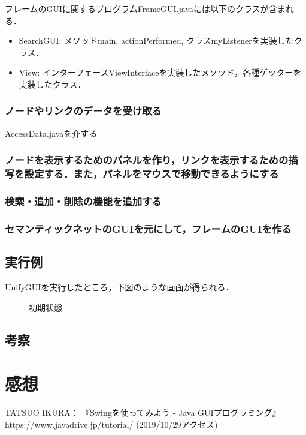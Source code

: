 \documentclass[12pt]{jarticle}
\begin{document}
フレームのGUIに関するプログラムFrameGUI.javaには以下のクラスが含まれる．
\begin{itemize}
\item SearchGUI: メソッドmain, actionPerformed, クラスmyListenerを実装したクラス．
\item View: インターフェースViewInterfaceを実装したメソッド，各種ゲッターを実装したクラス．
\end{itemize}

\subsubsection{ノードやリンクのデータを受け取る}
AccessData.javaを介する

\subsubsection{ノードを表示するためのパネルを作り，リンクを表示するための描写を設定する．また，パネルをマウスで移動できるようにする}

\subsubsection{検索・追加・削除の機能を追加する}

\subsubsection{セマンティックネットのGUIを元にして，フレームのGUIを作る}


\clearpage
\subsection{実行例}
UnifyGUIを実行したところ，下図のような画面が得られる．

\begin{figure}[!hbt]
  	\begin{center}
	\end{center}
  	\caption{初期状態}
\end{figure}
\clearpage


\subsection{考察}


\section{感想}


\begin{thebibliography}{99}
TATSUO IKURA： 『Swingを使ってみよう - Java GUIプログラミング』 https://www.javadrive.jp/tutorial/ (2019/10/29アクセス) \\
\end{thebibliography}
\end{document}
